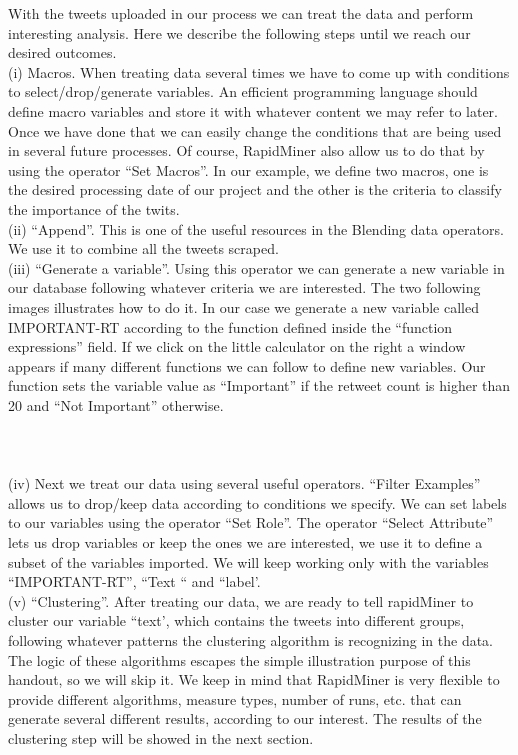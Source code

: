 \documentclass[12pt]{article}
\begin{document}
With the tweets uploaded in our process we can treat the data and perform interesting analysis. Here we describe the following steps until we reach our desired outcomes. \\

(i)	Macros. When treating data several times we have to come up with conditions to select/drop/generate variables. An efficient programming language should define macro variables and store it with whatever content we may refer to later. Once we have done that we can easily change the conditions that are being used in several future processes. Of course, RapidMiner also allow us to do that by using the operator “Set Macros”. In our example, we define two macros, one is the desired processing date of our project and the other is the criteria to classify the importance of the twits. \\

(ii)	“Append”. This is one of the useful resources in the Blending data operators. We use it to combine all the tweets scraped. \\

(iii)	“Generate a variable”. Using this operator we can generate a new variable in our database following whatever criteria we are interested. The two following images illustrates how to do it. In our case we generate a new variable called IMPORTANT-RT according to the function defined inside the “function expressions” field. If we click on the little calculator on the right a window appears if many different functions we can follow to define new variables. Our function sets the variable value as “Important” if the retweet count is higher than 20 and “Not Important” otherwise. \\
\\
[FIGURE 3] \\
[FIGURE 4] \\

(iv)	Next we treat our data using several useful operators. “Filter Examples” allows us to drop/keep data according to conditions we specify. We can set labels to our variables using the operator “Set Role”. The operator “Select Attribute” lets us drop variables or keep the ones we are interested, we use it to define a subset of the variables imported. We will keep working only with the variables “IMPORTANT-RT”, “Text “ and “label’. \\

(v)	“Clustering”. After treating our data, we are ready to tell rapidMiner to cluster our variable “text’, which contains the tweets into different groups, following whatever patterns the clustering algorithm is recognizing in the data. The logic of these algorithms escapes the simple illustration purpose of this handout, so we will skip it. We keep in mind that RapidMiner is very flexible to provide different algorithms, measure types, number of runs, etc. that can generate several different results, according to our interest. The results of the clustering step will be showed in the next section. \\
\end{document}
